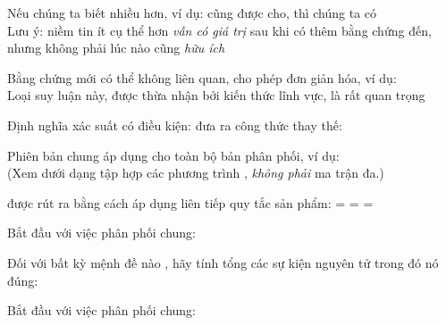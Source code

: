 \documentclass{article}
\begin{document}
\begin{huge}
Nếu chúng ta biết nhiều hơn, ví dụ:  cũng được cho, thì chúng ta có\al
  \\
Lưu ý: niềm tin ít cụ thể hơn \emph{ vẫn có giá trị } sau khi có thêm bằng chứng 
đến, nhưng không phải lúc nào cũng \emph{hữu ích}

Bằng chứng mới có thể không liên quan, cho phép đơn giản hóa, ví dụ:\al
{}\\
Loại suy luận này, được thừa nhận bởi kiến thức lĩnh vực, là rất quan trọng


Định nghĩa xác suất có điều kiện:
\mat{\[
  P(a|b) = \frac{P(a\land b)}{P(b)} \mbox{ if } P(b) \neq 0
\]}
 đưa ra công thức thay thế:\al

Phiên bản chung áp dụng cho toàn bộ bản phân phối, ví dụ:\al
  \\
(Xem dưới dạng tập hợp các phương trình , \emph{không phải } ma trận đa.)

 được rút ra bằng cách áp dụng liên tiếp quy tắc sản phẩm:\al
{}\nl
                    = \nl
                  = \mat{$\ldots$}\nl
                  = 


 


Bắt đầu với việc phân phối chung:

\textwidth
{}

Đối với bất kỳ mệnh đề nào \mat{$\phi$}, hãy tính tổng các sự kiện nguyên tử trong đó nó đúng:\al

\heading{Suy luận bằng phép liệt kê}

Bắt đầu với việc phân phối chung:


\end{huge}
\end{document}
